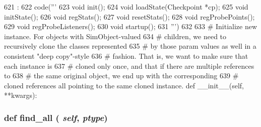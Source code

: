 \begin{DoxyCode}
621                                  :
622         code('''
623     void init();
624     void loadState(Checkpoint *cp);
625     void initState();
626     void regStats();
627     void resetStats();
628     void regProbePoints();
629     void regProbeListeners();
630     void startup();
631 ''')
632 
633     # Initialize new instance.  For objects with SimObject-valued
634     # children, we need to recursively clone the classes represented
635     # by those param values as well in a consistent "deep copy"-style
636     # fashion.  That is, we want to make sure that each instance is
637     # cloned only once, and that if there are multiple references to
638     # the same original object, we end up with the corresponding
639     # cloned references all pointing to the same cloned instance.
    def __init__(self, **kwargs):
\end{DoxyCode}
\hypertarget{classm5_1_1SimObject_1_1SimObject_a1ed210c5468a3c3a14c0156ab5d11ea0}{
\subsubsection[{find\_\-all}]{\setlength{\rightskip}{0pt plus 5cm}def find\_\-all ( {\em self}, \/   {\em ptype})}}
\label{classm5_1_1SimObject_1_1SimObject_a1ed210c5468a3c3a14c0156ab5d11ea0}



